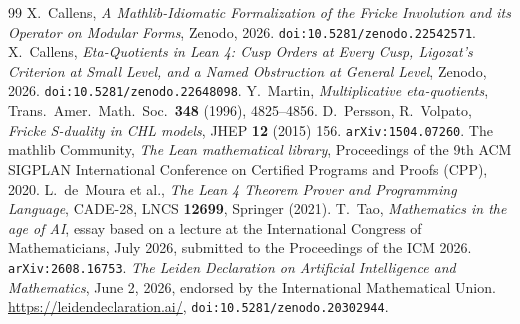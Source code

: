 \documentclass[11pt, a4paper]{article}
\theoremstyle{remark}
\begin{document}
\begin{thebibliography}{99}
 X.~Callens, \textit{A Mathlib-Idiomatic Formalization of the Fricke Involution
and its Operator on Modular Forms}, Zenodo, 2026. \texttt{doi:10.5281/zenodo.22542571}.
 X.~Callens, \textit{Eta-Quotients in Lean 4: Cusp Orders at Every Cusp,
Ligozat's Criterion at Small Level, and a Named Obstruction at General Level}, Zenodo, 2026.
\texttt{doi:10.5281/zenodo.22648098}.
 Y.~Martin, \textit{Multiplicative eta-quotients}, Trans.\ Amer.\ Math.\ Soc.\ \textbf{348} (1996), 4825--4856.
 D.~Persson, R.~Volpato, \textit{Fricke S-duality in CHL models}, JHEP \textbf{12} (2015) 156. \texttt{arXiv:1504.07260}.
 The mathlib Community, \textit{The Lean mathematical library}, Proceedings of the 9th ACM SIGPLAN International Conference on Certified Programs and Proofs (CPP), 2020.
 L.~de~Moura et al., \textit{The Lean 4 Theorem Prover and Programming Language}, CADE-28, LNCS \textbf{12699}, Springer (2021).
 T.~Tao, \textit{Mathematics in the age of AI}, essay based on a lecture at the
International Congress of Mathematicians, July 2026, submitted to the Proceedings of the ICM 2026.
\texttt{arXiv:2608.16753}.
 \textit{The Leiden Declaration on Artificial Intelligence and Mathematics},
June 2, 2026, endorsed by the International Mathematical Union. \url{https://leidendeclaration.ai/},
\texttt{doi:10.5281/zenodo.20302944}.
\end{thebibliography}
\end{document}
